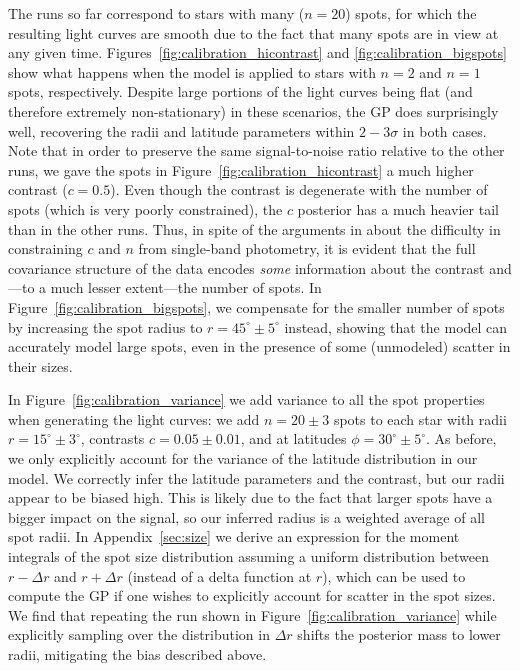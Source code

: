 \documentclass[modern,linenumbers]{aastex62}
\begin{document}
The runs so far correspond to stars with many ($n = 20$) spots, for which the
resulting light curves are smooth due to the fact that many spots are in
view at any given time. Figures~\ref{fig:calibration_hicontrast} and
\ref{fig:calibration_bigspots} show what happens when the model is applied to
stars with $n=2$ and $n=1$ spots, respectively. Despite large portions of the
light curves being flat (and therefore extremely non-stationary)
in these scenarios, the GP does surprisingly well, recovering the radii
and latitude parameters within $2-3\sigma$ in both cases.
Note that in order to preserve the same signal-to-noise ratio relative to
the other runs, we gave the spots in Figure~\ref{fig:calibration_hicontrast}
a much higher contrast ($c = 0.5$). Even though the contrast is degenerate
with the number of spots (which is very poorly constrained), the $c$ posterior
has a much heavier tail than in the other runs.
Thus, in spite of the arguments in \citet{PaperI} about the difficulty in
constraining $c$ and $n$ from single-band photometry, it is evident that
the full covariance structure of the data encodes \emph{some} information
about the contrast and---to a much lesser extent---the number of spots.
In Figure~\ref{fig:calibration_bigspots}, we compensate for the smaller number
of spots by increasing the spot radius to $r = 45^\circ \pm 5^\circ$ instead,
showing that the model can accurately model large spots, even in the
presence of some (unmodeled) scatter in their sizes.

In Figure~\ref{fig:calibration_variance} we add variance to all the spot
properties when generating the light curves: we add $n = 20 \pm 3$ spots
to each star with radii $r = 15^\circ \pm 3^\circ$, contrasts
$c = 0.05 \pm 0.01$, and at latitudes $\phi = 30^\circ \pm 5^\circ$.
As before, we only explicitly account for the variance of the latitude distribution in our
model. We correctly infer the latitude parameters and the contrast, but
our radii appear to be biased high. This is likely due to the fact that
larger spots have a bigger impact on the signal, so our inferred radius
is a weighted average of all spot radii. In Appendix~\ref{sec:size} we
derive an expression for the moment integrals of the spot size distribution
assuming a uniform distribution between $r - \Delta r$ and $r + \Delta r$
(instead of a delta function at $r$), which can be used to compute the
GP if one wishes to explicitly account for scatter in the spot sizes.
We find that repeating the run shown in Figure~\ref{fig:calibration_variance}
while explicitly sampling over the distribution in $\Delta r$ shifts the
posterior mass to lower radii, mitigating the bias described above.
\end{document}
